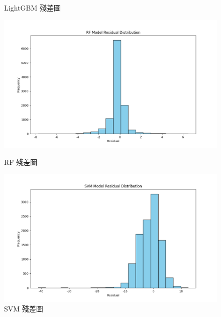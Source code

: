 \documentclass[12pt,a4paper]{article}
\begin{document}
\begin{enumerate}
\begin{enumerate}[label=\arabic*.]
\begin{enumerate}[label=3-2-\arabic*.]
\begin{enumerate}[label=\Alph*.]
\begin{figure}[H]
\begin{minipage}{0.45\textwidth}
                            \caption{LightGBM 殘差圖}
                            \label{fig:residual_lightgbm}
                        \end{minipage}
                        \begin{minipage}{0.45\textwidth}
                            \centering
                            \includegraphics[width=\textwidth]{resources/image/ResidualPlot/RF.png}
                            \caption{RF 殘差圖}
                            \label{fig:residual_rf}
                        \end{minipage}
                        \begin{minipage}{0.45\textwidth}
                            \centering
                            \includegraphics[width=\textwidth]{resources/image/ResidualPlot/SVM.png}
                            \caption{SVM 殘差圖}
                            \label{fig:residual_svm}
                        \end{minipage}
                        \begin{minipage}{0.45\textwidth}

\end{minipage}
\end{figure}
\end{enumerate}
\end{enumerate}
\end{enumerate}
\end{enumerate}
\end{document}
